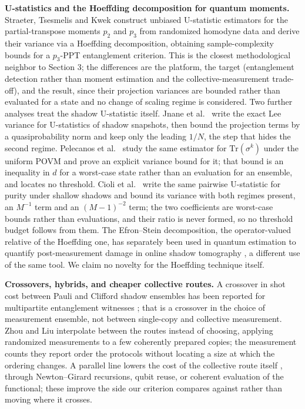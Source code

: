 \documentclass[a4paper,superscriptaddress,nofootinbib,onecolumn,nopdfoutputerror]{quantumarticle}
\begin{document}
\textbf{U-statistics and the Hoeffding decomposition for quantum
moments.} Straeter, Tsesmelis and Kwek \cite{straeter2026} construct
unbiased U-statistic estimators for the partial-transpose moments \(p_2\)
and \(p_3\) from randomized homodyne data and derive their variance via a
Hoeffding decomposition, obtaining sample-complexity bounds for a
\(p_3\)-PPT entanglement criterion. This is the closest methodological
neighbor to Section 3; the differences are the platform, the target
(entanglement detection rather than moment estimation and the
collective-measurement trade-off), and the result, since their projection
variances are bounded rather than evaluated for a state and no change of
scaling regime is considered. Two further analyses treat the shadow
U-statistic itself. Jnane et al.~\cite{jnane2024mitigated} write the exact
Lee variance for U-statistics of shadow snapshots, then bound the
projection terms by a quasiprobability norm and keep only the leading
\(1/N\), the step that hides the second regime. Pelecanos et
al.~\cite{pelecanos2025spectrum} study the same estimator for
\(\mathrm{Tr}(\sigma^k)\) under the uniform POVM and prove an explicit
variance bound for it; that bound is an inequality in \(d\) for a
worst-case state rather than an evaluation for an ensemble, and locates no
threshold. Cioli et
al.~\cite{cioli2025shallow} write the same pairwise U-statistic for purity
under shallow shadows and bound its variance with both regimes present, an
\(M^{-1}\) term and an \((M-1)^{-2}\) term; the two coefficients are
worst-case bounds rather than evaluations, and their ratio is never formed,
so no threshold budget follows from them. The Efron--Stein decomposition,
the operator-valued relative of the Hoeffding one, has separately been used
in quantum estimation to quantify post-measurement damage in online shadow
tomography \cite{chen2026online}, a different use of the same tool. We
claim no novelty for the Hoeffding technique itself.

\textbf{Crossovers, hybrids, and cheaper collective routes.} A crossover in
shot cost between Pauli and Clifford shadow ensembles has been reported for
multipartite entanglement witnesses \cite{paulicliffordxover2026}; that is a
crossover in the choice of measurement ensemble, not between single-copy and
collective measurement. Zhou and Liu \cite{zhou2024hybrid} interpolate
between the routes instead of choosing, applying randomized measurements to
a few coherently prepared copies; the measurement counts they report order
the protocols without locating a size at which the ordering changes. A
parallel line lowers the cost of the collective route itself
\cite{shin2025resource, shi2025moments, yao2026sample}, through
Newton--Girard recursions, qubit reuse, or coherent evaluation of the
functional; these improve the side our criterion compares against rather
than moving where it crosses.
\end{document}
